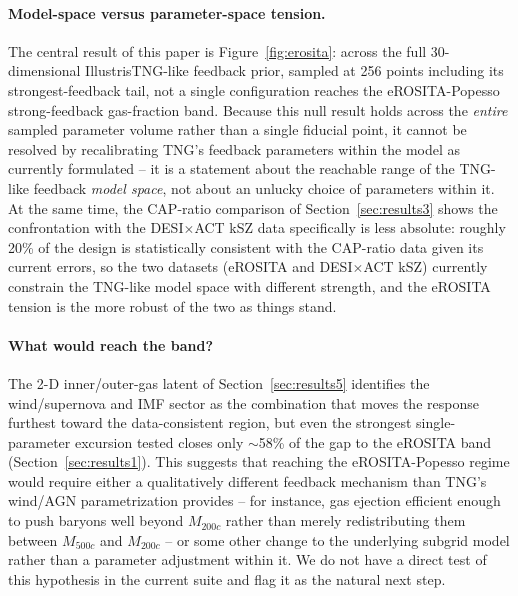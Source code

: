 \documentclass[11pt]{article}
\newcommand{\Mhalo}{M_{200c}}
\newcommand{\Mfive}{M_{500c}}
\begin{document}
\paragraph{Model-space versus parameter-space tension.} The central result of
this paper is Figure~\ref{fig:erosita}: across the full 30-dimensional
IllustrisTNG-like feedback prior, sampled at 256 points including its
strongest-feedback tail, not a single configuration reaches the
eROSITA-Popesso strong-feedback gas-fraction band. Because this null result
holds across the \emph{entire} sampled parameter volume rather than a single
fiducial point, it cannot be resolved by recalibrating TNG's feedback
parameters within the model as currently formulated -- it is a statement about
the reachable range of the TNG-like feedback \emph{model space}, not about an
unlucky choice of parameters within it. At the same time, the CAP-ratio
comparison of Section~\ref{sec:results3} shows the confrontation with the
DESI$\times$ACT kSZ data specifically is less absolute: roughly 20\% of the
design is statistically consistent with the CAP-ratio data given its current
errors, so the two datasets (eROSITA and DESI$\times$ACT kSZ) currently
constrain the TNG-like model space with different strength, and the eROSITA
tension is the more robust of the two as things stand.

\paragraph{What would reach the band?} The 2-D inner/outer-gas latent of
Section~\ref{sec:results5} identifies the wind/supernova and IMF sector as the
combination that moves the response furthest toward the data-consistent
region, but even the strongest single-parameter excursion tested closes only
$\sim$58\% of the gap to the eROSITA band (Section~\ref{sec:results1}). This
suggests that reaching the eROSITA-Popesso regime would require either a
qualitatively different feedback mechanism than TNG's wind/AGN
parametrization provides -- for instance, gas ejection efficient enough to
push baryons well beyond $\Mhalo$ rather than merely redistributing them
between $\Mfive$ and $\Mhalo$ -- or some other change to the underlying
subgrid model rather than a parameter adjustment within it. We do not have a
direct test of this hypothesis in the current suite and flag it as the natural
next step.
\end{document}
